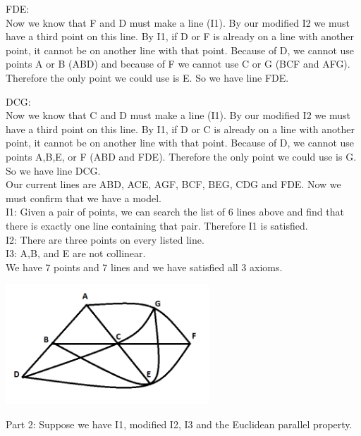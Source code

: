 \documentclass[12pt,letterpaper]{article}
\newcommand{\Proof}{\noindent {\bf Proof: }}
\begin{document}
\noindent FDE:\\

Now we know that F and D must make a line (I1).  By our modified I2 we must have a third point on this line.  By I1, if D or F is already on a line with another point, it cannot be on another line with that point.  Because of D, we cannot use points A or B (ABD) and because of F we cannot use C or G (BCF and AFG).  Therefore the only point we could use is E.  So we have line FDE.

\noindent DCG:\\

Now we know that C and D must make a line (I1).  By our modified I2 we must have a third point on this line.  By I1, if D or C is already on a line with another point, it cannot be on another line with that point.  Because of D, we cannot use points A,B,E, or F (ABD and FDE).  Therefore the only point we could use is G.  So we have line DCG.\\


Our current lines are ABD, ACE, AGF, BCF, BEG, CDG and FDE.  Now we must confirm that we have a model.\\

I1: Given a pair of points, we can search the list of 6 lines above and find that there is exactly one line containing that pair.  Therefore I1 is satisfied. \\

I2: There are three points on every listed line.\\

I3: A,B, and E are not collinear.\\

We have 7 points and 7 lines and we have satisfied all 3 axioms. 


\includegraphics[width=3in]{lines.png}




\newpage 
Part 2:  Suppose we have I1, modified I2, I3 and the Euclidean parallel property. \\

\Proof
\end{document}
